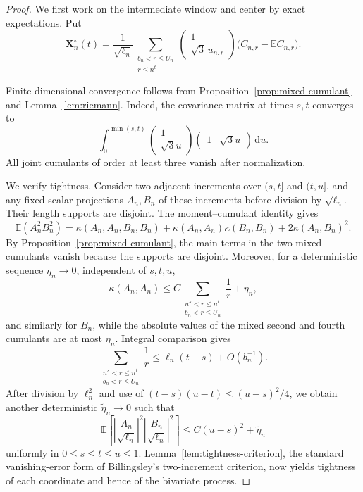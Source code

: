\documentclass[11pt]{article}
\theoremstyle{definition}
\theoremstyle{remark}
\newcommand{\Ee}{\mathbb E}
\newcommand{\dd}{\,\mathrm d}
\begin{document}
\begin{proof}
We first work on the intermediate window and center by exact expectations.
Put
\[
 \mathbf X_n^\circ(t)
 =
 \frac1{\sqrt{\ell_n}}
 \sum_{\substack{b_n<r\le U_n\\r\le n^t}}
 \begin{pmatrix}
 1\\
 \sqrt3\,u_{n,r}
 \end{pmatrix}
 \bigl(C_{n,r}-\Ee C_{n,r}\bigr).
\]

Finite-dimensional convergence follows from
Proposition~\ref{prop:mixed-cumulant} and
Lemma~\ref{lem:riemann}.  Indeed, the covariance matrix at times $s,t$
converges to
\[
 \int_0^{\min(s,t)}
 \begin{pmatrix}
 1\\ \sqrt3u
 \end{pmatrix}
 \begin{pmatrix}
 1&\sqrt3u
 \end{pmatrix}\dd u.
\]
All joint cumulants of order at least three vanish after normalization.

We verify tightness.  Consider two adjacent increments over $(s,t]$ and
$(t,u]$, and any fixed scalar projections $A_n,B_n$ of these increments
before division by $\sqrt{\ell_n}$.  Their length supports are disjoint.
The moment--cumulant identity gives
\[
 \Ee(A_n^2B_n^2)
 =
 \kappa(A_n,A_n,B_n,B_n)
 +\kappa(A_n,A_n)\kappa(B_n,B_n)
 +2\kappa(A_n,B_n)^2.
\]
By Proposition~\ref{prop:mixed-cumulant}, the main terms in the two mixed
cumulants vanish because the supports are disjoint.  Moreover, for a
deterministic sequence $\eta_n\to0$, independent of $s,t,u$,
\[
 \kappa(A_n,A_n)
 \le C\sum_{\substack{n^s<r\le n^t\\b_n<r\le U_n}}\frac1r+\eta_n,
\]
and similarly for $B_n$, while the absolute values of the mixed second and
fourth cumulants are at most $\eta_n$.  Integral comparison gives
\[
 \sum_{\substack{n^s<r\le n^t\\b_n<r\le U_n}}\frac1r
 \le \ell_n(t-s)+O(b_n^{-1}).
\]
After division by $\ell_n^2$ and use of
$(t-s)(u-t)\le (u-s)^2/4$, we obtain another deterministic
$\widetilde\eta_n\to0$ such that
\[
 \Ee\left[
 \left|\frac{A_n}{\sqrt{\ell_n}}\right|^2
 \left|\frac{B_n}{\sqrt{\ell_n}}\right|^2
 \right]
 \le C(u-s)^2+\widetilde\eta_n
\]
uniformly in $0\le s\le t\le u\le1$.  Lemma~\ref{lem:tightness-criterion},
the standard vanishing-error form of Billingsley's two-increment
criterion, now yields tightness of each coordinate and hence of the
bivariate process.


\end{proof}
\end{document}
